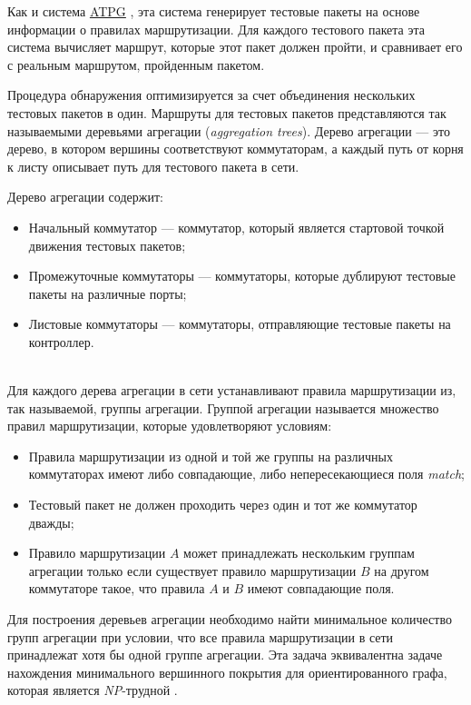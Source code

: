 \documentclass[../thesis.tex]{subfiles}
\begin{document}
{
\hypersetup{linkcolor=black}

Как и система  \hyperref[subsection:atpg]{ATPG} \cite{zeng2012automatic}, эта система генерирует тестовые пакеты на основе информации о правилах маршрутизации.
Для каждого тестового пакета эта система вычисляет маршрут, которые этот пакет должен пройти, и сравнивает его с реальным маршрутом, пройденным пакетом.
}

Процедура обнаружения оптимизируется за счет объединения нескольких тестовых пакетов в один.
Маршруты для тестовых пакетов представляются так называемыми деревьями агрегации (\textit{aggregation trees}).
Дерево агрегации --- это дерево, в котором вершины соответствуют коммутаторам, а каждый путь от корня к листу описывает путь для тестового пакета в сети.

Дерево агрегации содержит:
\begin{itemize}
\item Начальный коммутатор --- коммутатор, который является стартовой точкой движения тестовых пакетов;
\item Промежуточные коммутаторы --- коммутаторы, которые дублируют тестовые пакеты на различные порты;
\item Листовые коммутаторы --- коммутаторы, отправляющие тестовые пакеты на контроллер.
\end{itemize}
\ \\

Для каждого дерева агрегации в сети устанавливают правила маршрутизации из, так называемой, группы агрегации.
Группой агрегации называется множество правил маршрутизации, которые удовлетворяют условиям:
\begin{itemize}
\item Правила маршрутизации из одной и той же группы на различных коммутаторах имеют либо совпадающие, либо непересекающиеся поля \textit{match};
\item Тестовый пакет не должен проходить через один и тот же коммутатор дважды;
\item Правило маршрутизации $A$ может принадлежать нескольким группам агрегации только если существует правило маршрутизации $B$ на другом коммутаторе такое, что правила $A$ и $B$ имеют совпадающие поля.
\end{itemize}

Для построения деревьев агрегации необходимо найти минимальное количество групп агрегации при условии, что все правила маршрутизации в сети принадлежат хотя бы одной группе агрегации.
Эта задача эквивалентна задаче нахождения минимального вершинного покрытия для ориентированного графа, которая является \textit{NP}-трудной \cite{garey2002computers, cormen2009introduction, chiu2017rapid}.
\end{document}
